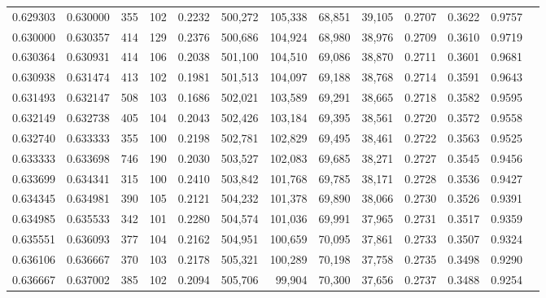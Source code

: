 \begin{tabular}{rrrrrrrrrrrrr}
0.629303 & 0.630000 &    355 &   102 &                                     0.2232 & 500,272 & 105,338 &  68,851 &  39,105 & 0.2707 & 0.3622 & 0.9757 \\
0.630000 & 0.630357 &    414 &   129 &                                     0.2376 & 500,686 & 104,924 &  68,980 &  38,976 & 0.2709 & 0.3610 & 0.9719 \\
0.630364 & 0.630931 &    414 &   106 &                                     0.2038 & 501,100 & 104,510 &  69,086 &  38,870 & 0.2711 & 0.3601 & 0.9681 \\
0.630938 & 0.631474 &    413 &   102 &                                     0.1981 & 501,513 & 104,097 &  69,188 &  38,768 & 0.2714 & 0.3591 & 0.9643 \\
0.631493 & 0.632147 &    508 &   103 &                                     0.1686 & 502,021 & 103,589 &  69,291 &  38,665 & 0.2718 & 0.3582 & 0.9595 \\
0.632149 & 0.632738 &    405 &   104 &                                     0.2043 & 502,426 & 103,184 &  69,395 &  38,561 & 0.2720 & 0.3572 & 0.9558 \\
0.632740 & 0.633333 &    355 &   100 &                                     0.2198 & 502,781 & 102,829 &  69,495 &  38,461 & 0.2722 & 0.3563 & 0.9525 \\
0.633333 & 0.633698 &    746 &   190 &                                     0.2030 & 503,527 & 102,083 &  69,685 &  38,271 & 0.2727 & 0.3545 & 0.9456 \\
0.633699 & 0.634341 &    315 &   100 &                                     0.2410 & 503,842 & 101,768 &  69,785 &  38,171 & 0.2728 & 0.3536 & 0.9427 \\
0.634345 & 0.634981 &    390 &   105 &                                     0.2121 & 504,232 & 101,378 &  69,890 &  38,066 & 0.2730 & 0.3526 & 0.9391 \\
0.634985 & 0.635533 &    342 &   101 &                                     0.2280 & 504,574 & 101,036 &  69,991 &  37,965 & 0.2731 & 0.3517 & 0.9359 \\
0.635551 & 0.636093 &    377 &   104 &                                     0.2162 & 504,951 & 100,659 &  70,095 &  37,861 & 0.2733 & 0.3507 & 0.9324 \\
0.636106 & 0.636667 &    370 &   103 &                                     0.2178 & 505,321 & 100,289 &  70,198 &  37,758 & 0.2735 & 0.3498 & 0.9290 \\
0.636667 & 0.637002 &    385 &   102 &                                     0.2094 & 505,706 &  99,904 &  70,300 &  37,656 & 0.2737 & 0.3488 & 0.9254 \\

\end{tabular}
